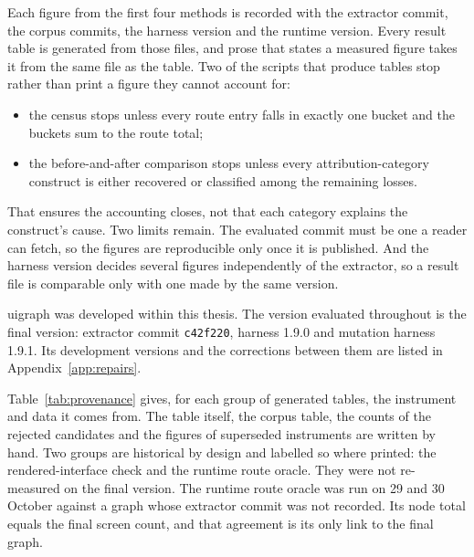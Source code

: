 Each figure from the first four methods is recorded with the extractor commit, the corpus commits, the
harness version and the runtime version. Every result table is generated from those files, and prose
that states a measured figure takes it from the same file as the table. Two of the scripts that produce tables stop
rather than print a figure they cannot account for:
\begin{itemize}
\item the census stops unless every route entry falls in exactly one bucket and the buckets sum to the route total;
\item the before-and-after comparison stops unless every attribution-category construct is either recovered or classified among the remaining
losses.
\end{itemize} That ensures the accounting closes, not that each category explains the construct's cause.
Two limits remain. The evaluated commit must be one a reader can fetch, so the figures are
reproducible only once it is published. And the harness version decides several figures independently
of the extractor, so a result file is comparable only with one made by the same version.

uigraph was developed within this thesis. The version evaluated throughout is the final version:
extractor commit \texttt{c42f220}, harness 1.9.0 and mutation harness 1.9.1. Its development versions and
the corrections between them are listed in Appendix~\ref{app:repairs}.

Table~\ref{tab:provenance} gives, for each group of generated tables, the instrument and data it
comes from. The table itself, the corpus table, the counts of the rejected candidates and the
figures of superseded instruments are written by hand. Two groups are historical by design and
labelled so where printed: the rendered-interface check and the runtime route oracle. They were not
re-measured on the final version. The runtime route oracle was run on 29 and 30 October against a
graph whose extractor commit was not recorded. Its node total equals the final screen count, and that
agreement is its only link to the final graph.

